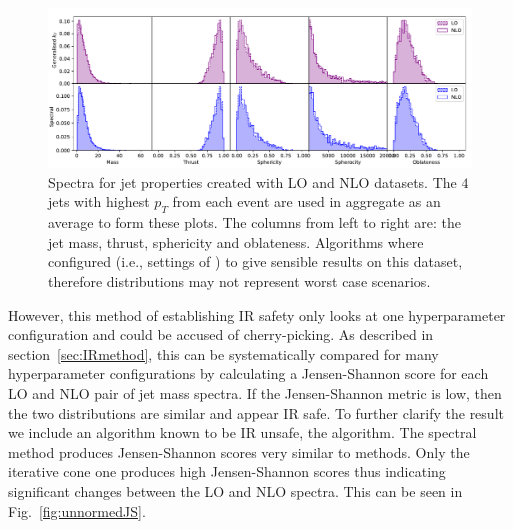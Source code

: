 \begin{figure}[htp]
    \includegraphics[width=\textwidth]{graphics/array_of_variables2_filled}
    \caption{Spectra for jet properties created with LO and NLO datasets.
             The \(4\) jets with highest \(p_T\) from each event are used in aggregate as an average to 
             form these plots.
             The columns from left to right are: the jet mass, 
             thrust, sphericity and oblateness.
             Algorithms where configured (i.e., settings of \stoppingdeltar{})
             to give sensible results on
             this dataset, therefore distributions may not represent worst case scenarios.
         }\label{fig:IRC_singles2}
\end{figure}    

However, this method of establishing IR safety only looks at one hyperparameter configuration and could be accused of cherry-picking.
As described in section~\ref{sec:IRmethod}, this can be systematically compared for many hyperparameter configurations by calculating a Jensen-Shannon
score for each LO and NLO pair of jet mass spectra.
If the Jensen-Shannon metric is low, then the two distributions are similar and appear IR safe.
To further clarify the result we include an algorithm known to be IR unsafe, the \itercone{} algorithm.
The spectral method produces Jensen-Shannon scores very similar to \genkt{} methods. Only the iterative cone one produces high Jensen-Shannon scores thus indicating significant changes between the LO and NLO spectra.
This can be seen in Fig.~\ref{fig:unnormedJS}.

